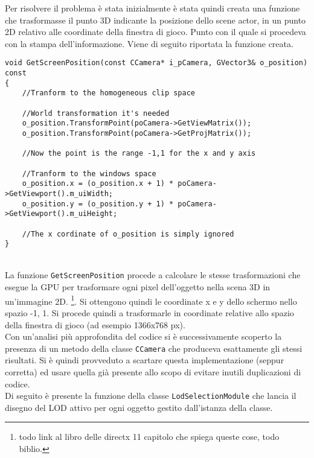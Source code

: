Per risolvere il problema è stata inizialmente è stata quindi creata una funzione che trasformasse il punto 3D indicante la posizione dello scene actor, in un punto 2D relativo alle coordinate della finestra di gioco. Punto con il quale si procedeva con la stampa dell'informazione. Viene di seguito riportata la funzione creata.\\

\begin{lstlisting}[style=maurizio-code]
void GetScreenPosition(const CCamera* i_pCamera, GVector3& o_position) const
{	
	//Tranform to the homogeneous clip space
	
	//World transformation it's needed
	o_position.TransformPoint(poCamera->GetViewMatrix());
	o_position.TransformPoint(poCamera->GetProjMatrix());
	
	//Now the point is the range -1,1 for the x and y axis
	
	//Tranform to the windows space
	o_position.x = (o_position.x + 1) * poCamera->GetViewport().m_uiWidth;
	o_position.y = (o_position.y + 1) * poCamera->GetViewport().m_uiHeight;
	
	//The x cordinate of o_position is simply ignored 
}
\end{lstlisting}
~\\
La funzione \texttt{GetScreenPosition} procede a calcolare le stesse trasformazioni che esegue la GPU per trasformare ogni pixel dell'oggetto nella scena 3D in un'immagine 2D. \footnote{todo link al libro delle directx 11 capitolo che spiega queste cose, todo biblio.}. Si ottengono quindi le coordinate x e y dello schermo nello spazio -1, 1. Si procede quindi a trasformarle in coordinate relative allo spazio della finestra di gioco (ad esempio 1366x768 px).\\

Con un'analisi più approfondita del codice si è successivamente scoperto la presenza di un metodo della classe \texttt{CCamera} che produceva esattamente gli stessi risultati. Si è quindi provveduto a scartare questa implementazione (seppur corretta) ed usare quella già presente allo scopo di evitare inutili duplicazioni di codice.\\

Di seguito è presente la funzione della classe \texttt{LodSelectionModule} che lancia il disegno del LOD attivo per ogni oggetto gestito dall'istanza della classe.\\

